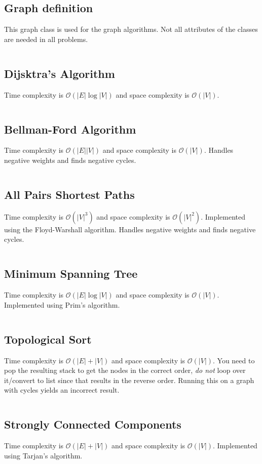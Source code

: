 \documentclass[8pt,a4paper,landscape,oneside]{amsart}
\newcommand{\code}[1]{\inputminted[fontsize=\normalsize,baselinestretch=1]{java}{code/#1}}
\newcommand{\bigO}{\mathcal{O}}
\begin{document}
\begin{multicols*}{3}
  \subsection{Graph definition}
  This graph class is used for the graph algorithms. Not all attributes of the classes are needed in all problems.
  \code{Graphs/Graph.java}
  
  \subsection{Dijsktra's Algorithm}
  Time complexity is $\bigO(|E| \log{|V|})$ and space complexity is $\bigO(|V|)$.
  \code{Graphs/Dijkstras.java}
  
  \subsection{Bellman-Ford Algorithm}
  Time complexity is $\bigO(|E||V|)$ and space complexity is $\bigO(|V|)$. Handles negative weights and finds negative cycles.
  \code{Graphs/BellmanFord.java}
  
  \subsection{All Pairs Shortest Paths}
  Time complexity is $\bigO(|V|^3)$ and space complexity is $\bigO(|V|^2)$. Implemented using the Floyd-Warshall algorithm. Handles negative weights and finds negative cycles.
  \code{Graphs/FloydWarshall.java}
  
  \subsection{Minimum Spanning Tree}
  Time complexity is $\bigO(|E| \log{|V|})$ and space complexity is $\bigO(|V|)$. Implemented using Prim's algorithm.
  \code{Graphs/MST.java}
  
  \subsection{Topological Sort}
  Time complexity is $\bigO(|E| + |V|)$ and space complexity is $\bigO(|V|)$. You need to pop the resulting stack to get the nodes in the correct order, \textit{do not} loop over it/convert to list since that results in the reverse order. Running this on a graph with cycles yields an incorrect result.
  \code{Graphs/TopologicalSort.java}
  
  \subsection{Strongly Connected Components}
  Time complexity is $\bigO(|E| + |V|)$ and space complexity is $\bigO(|V|)$. Implemented using Tarjan's algorithm.
  \code{Graphs/StronglyConnectedComponents.java}
  

\end{multicols*}
\end{document}
